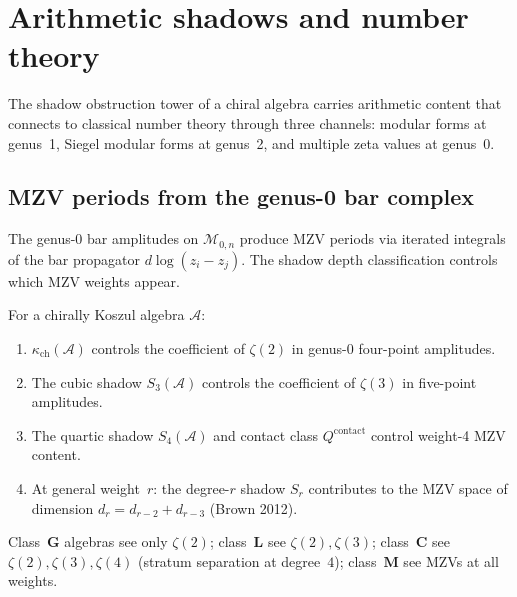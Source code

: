 \documentclass[11pt]{article}
\newcommand{\cA}{\mathcal{A}}
\newcommand{\cM}{\mathcal{M}}
\begin{document}
\section{Arithmetic shadows and number theory}
\label{sec:arithmetic-shadows}

The shadow obstruction tower of a chiral algebra carries arithmetic content
that connects to classical number theory through three channels:
modular forms at genus~1, Siegel modular forms at genus~2, and
multiple zeta values at genus~0.

\subsection{MZV periods from the genus-0 bar complex}

The genus-0 bar amplitudes on $\cM_{0,n}$ produce MZV periods
via iterated integrals of the bar propagator $d\log(z_i - z_j)$.
The shadow depth classification controls which MZV weights appear.

\begin{theorem}
\label{thm:wn-shadow-mzv}
For a chirally Koszul algebra $\cA$:
\begin{enumerate}[label=\textup{(\roman*)}]
\item $\kappa_{\mathrm{ch}}(\cA)$ controls the coefficient of
 $\zeta(2)$ in genus-0 four-point amplitudes.
\item The cubic shadow $S_3(\cA)$ controls the coefficient of
 $\zeta(3)$ in five-point amplitudes.
\item The quartic shadow $S_4(\cA)$ and contact class
 $Q^{\mathrm{contact}}$ control weight-4 MZV content.
\item At general weight~$r$: the degree-$r$ shadow $S_r$
 contributes to the MZV space of dimension
 $d_r = d_{r-2} + d_{r-3}$ (Brown 2012).
\end{enumerate}
Class~$\mathbf{G}$ algebras see only $\zeta(2)$;
class~$\mathbf{L}$ see $\zeta(2), \zeta(3)$;
class~$\mathbf{C}$ see $\zeta(2), \zeta(3), \zeta(4)$
\textup{(}stratum separation at degree~$4$\textup{)};
class~$\mathbf{M}$ see MZVs at all weights.
\end{theorem}
\end{document}

